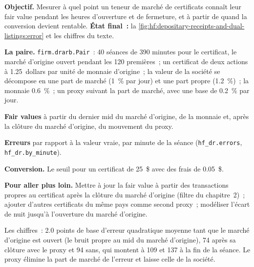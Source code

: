 \begin{tutorial}
\textbf{Objectif.} Mesurer à quel point un teneur de marché de certificats connaît leur fair value pendant les heures d'ouverture et de fermeture, et à partir de quand la conversion devient rentable. \textbf{État final~:}
la \cref{fig:hf:depositary-receipts-and-dual-listings:error} et les chiffres du texte.
\begin{tutsteps}
\item \textbf{La paire.} \texttt{firm.drarb.Pair}~: 40 séances de 390 minutes pour le certificat, le marché d'origine ouvert pendant les 120 premières~; un certificat de deux
actions à 1.25~dollars par unité de monnaie d'origine~; la valeur de la société se décompose en une part de marché (1~\% par jour) et une part propre (1.2~\%)~; la monnaie 0.6~\%~; un proxy
suivant la part de marché, avec une base de 0.2~\% par jour.
\item \textbf{Fair values} à partir du dernier mid du marché d'origine, de la monnaie et, après la clôture du marché d'origine, du mouvement du proxy.
\label{lst:hf:depositary-receipts-and-dual-listings:quote}
\item \textbf{Erreurs} par rapport à la valeur vraie, par minute de la séance (\texttt{hf\_dr.errors}, \texttt{hf\_dr.by\_minute}).
\item \textbf{Conversion.} Le seuil pour un certificat de 25~\$ avec des frais de 0.05~\$.
\label{lst:hf:depositary-receipts-and-dual-listings:conversion}
\end{tutsteps}
\textbf{Pour aller plus loin.} Mettre à jour la fair value à partir des transactions propres au certificat après la clôture du marché d'origine (filtre du chapitre~2)~; ajouter d'autres certificats
du même pays comme second proxy~; modéliser l'écart de nuit jusqu'à l'ouverture du marché d'origine.
\end{tutorial}

Les chiffres~: 2.0 points de base d'erreur quadratique moyenne tant que le marché d'origine est ouvert (le bruit propre au mid du marché d'origine), 74 après sa clôture avec le proxy
et 94 sans, qui montent à 109 et 137 à la fin de la séance. Le proxy élimine la part de marché de l'erreur et laisse celle de la société.

